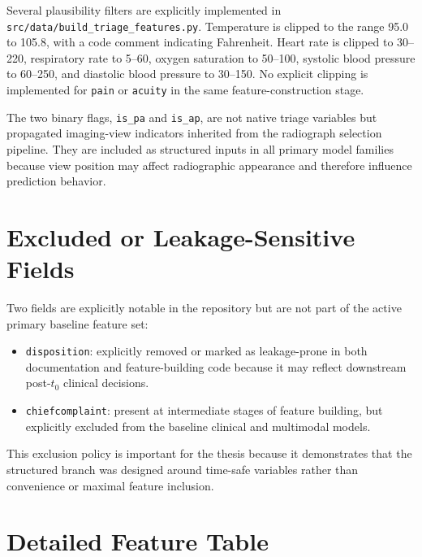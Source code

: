 Several plausibility filters are explicitly implemented in \texttt{src/data/build\_triage\_features.py}. Temperature is clipped to the range 95.0 to 105.8, with a code comment indicating Fahrenheit. Heart rate is clipped to 30--220, respiratory rate to 5--60, oxygen saturation to 50--100, systolic blood pressure to 60--250, and diastolic blood pressure to 30--150. No explicit clipping is implemented for \texttt{pain} or \texttt{acuity} in the same feature-construction stage.

The two binary flags, \texttt{is\_pa} and \texttt{is\_ap}, are not native triage variables but propagated imaging-view indicators inherited from the radiograph selection pipeline. They are included as structured inputs in all primary model families because view position may affect radiographic appearance and therefore influence prediction behavior.

\section{Excluded or Leakage-Sensitive Fields}

Two fields are explicitly notable in the repository but are not part of the active primary baseline feature set:

\begin{itemize}
    \item \texttt{disposition}: explicitly removed or marked as leakage-prone in both documentation and feature-building code because it may reflect downstream post-\(t_0\) clinical decisions.
    \item \texttt{chiefcomplaint}: present at intermediate stages of feature building, but explicitly excluded from the baseline clinical and multimodal models.
\end{itemize}

This exclusion policy is important for the thesis because it demonstrates that the structured branch was designed around time-safe variables rather than convenience or maximal feature inclusion.

\section{Detailed Feature Table}


